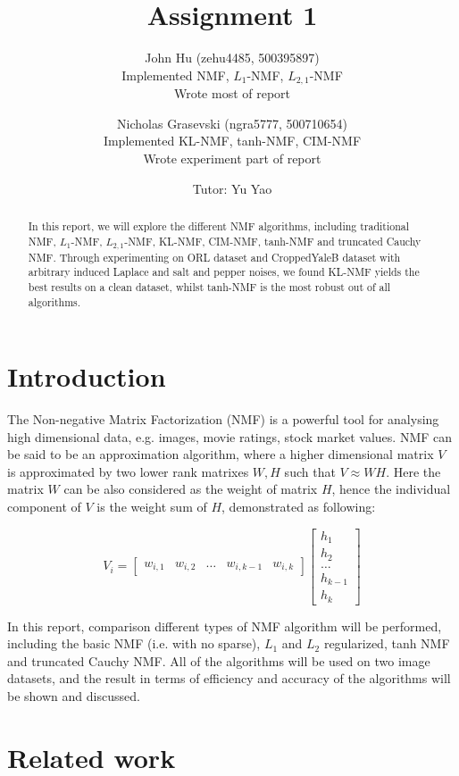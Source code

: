 \documentclass{article} %
\title{Assignment 1}
\author{
  John Hu (zehu4485, 500395897)\\
  Implemented NMF, $L_1$-NMF, $L_{2,1}$-NMF\\
  Wrote most of report
  \and
  Nicholas Grasevski (ngra5777, 500710654)\\
  Implemented KL-NMF, tanh-NMF, CIM-NMF\\
  Wrote experiment part of report
  \and
  Tutor: Yu Yao
}
\begin{document}
\maketitle

\begin{abstract}
In this report, we will explore the different NMF algorithms, including traditional NMF, $L_1$-NMF, $L_{2,1}$-NMF, KL-NMF, CIM-NMF, tanh-NMF and truncated Cauchy NMF. Through experimenting on ORL dataset and CroppedYaleB dataset with arbitrary induced Laplace and salt and pepper noises, we found KL-NMF yields the best results on a clean dataset, whilst tanh-NMF is the most robust out of all algorithms.
\end{abstract}

\section{Introduction}
The Non-negative Matrix Factorization (NMF) is a powerful tool for analysing high dimensional data, e.g. images, movie ratings, stock market values. NMF can be said to be an approximation algorithm, where a higher dimensional matrix $V$ is approximated by two lower rank matrixes $W,H$ such that $V \approx WH$. Here the matrix $W$ can be also considered as the weight of matrix $H$, hence the individual component of $V$ is the weight sum of $H$, demonstrated as following:

\begin{equation}
V_i = \begin{bmatrix}
w_{i,1} & w_{i,2} & \dots & w_{i,k-1} & w_{i,k}
\end{bmatrix} \begin{bmatrix}
h_1\\ 
h_2\\ 
\dots\\ 
h_{k-1}\\ 
h_k
\end{bmatrix}
\end{equation}

In this report, comparison different types of NMF algorithm will be performed, including the basic NMF (i.e. with no sparse), $L_1$ and $L_2$ regularized, tanh NMF and truncated Cauchy NMF. All of the algorithms will be used on two image datasets, and the result in terms of efficiency and accuracy of the algorithms will be shown and discussed.

\section{Related work}
\end{document}
